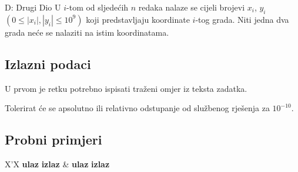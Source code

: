 \begin{statement}[
  timelimit=1 s,
  memorylimit=512 MiB,
]{D: Drugi Dio}
U $i$-tom od sljedećih $n$ redaka nalaze se cijeli brojevi $x_i$, $y_i$
$(0 \le |x_i|, |y_i| \le 10^9)$ koji predstavljaju koordinate $i$-tog
grada. Niti jedna dva grada neće se nalaziti na istim koordinatama.

\subsection*{Izlazni podaci}
U prvom je retku potrebno ispisati traženi omjer iz teksta zadatka.

Tolerirat će se apsolutno ili relativno odstupanje od službenog rješenja
za $10^{-10}$.

\subsection*{Probni primjeri}
\begin{tabularx}{\textwidth}{X'X}
  \textbf{ulaz}
  \linespread{1}{}
  \textbf{izlaz}
  \linespread{1}{} &
  \textbf{ulaz}
  \linespread{1}{}
  \textbf{izlaz}
  \linespread{1}{}
\end{tabularx}

\end{statement}

